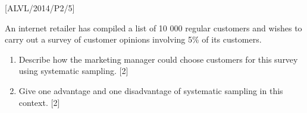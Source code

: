 \item {[}ALVL/2014/P2/5{]}

An internet retailer has compiled a list of 10 000 regular customers
and wishes to carry out a survey of customer opinions involving 5\%
of its customers.
\begin{enumerate}
\item Describe how the marketing manager could choose customers for this
survey using systematic sampling.\hfill{} {[}2{]}
\item Give one advantage and one disadvantage of systematic sampling in
this context. \hfill{}{[}2{]}
\end{enumerate}
